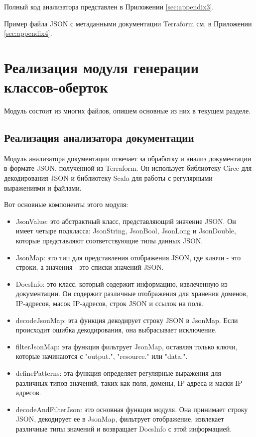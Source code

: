 Полный код анализатора представлен в Приложении \ref{sec:appendix3}.

Пример файла JSON с метаданными документации Terraform см. в Приложении
\ref{sec:appendix4}.

\section{Реализация модуля генерации классов-оберток}

Модуль состоит из многих файлов, опишем основные из них в текущем разделе.

\subsection{Реализация анализатора документации}

Модуль анализатора документации отвечает за обработку и анализ документации в
формате JSON, полученной из Terraform. Он использует библиотеку Circe для
декодирования JSON и библиотеку Scala для работы с регулярными выражениями и
файлами.

Вот основные компоненты этого модуля:

\begin{itemize}
  \item JsonValue: это абстрактный класс, представляющий значение JSON. Он имеет
четыре подкласса: JsonString, JsonBool, JsonLong и JsonDouble, которые
представляют соответствующие типы данных JSON.

  \item JsonMap: это тип для представления отображения JSON, где ключи - это
строки, а значения - это списки значений JSON.
  
  \item DocsInfo: это класс, который содержит информацию, извлеченную из
документации. Он содержит различные отображения для хранения доменов,
IP-адресов, масок IP-адресов, строк JSON и ссылок на поля.
  
  \item decodeJsonMap: эта функция декодирует строку JSON в JsonMap. Если
происходит ошибка декодирования, она выбрасывает исключение.
  
  \item filterJsonMap: эта функция фильтрует JsonMap, оставляя только ключи,
которые начинаются с "output.", "resource." или "data.".
  
  \item definePatterns: эта функция определяет регулярные выражения для
различных типов значений, таких как поля, домены, IP-адреса и маски IP-адресов.
  
  \item decodeAndFilterJson: это основная функция модуля. Она принимает строку
JSON, декодирует ее в JsonMap, фильтрует отображение, извлекает различные типы
значений и возвращает DocsInfo с этой информацией.
\end{itemize}

